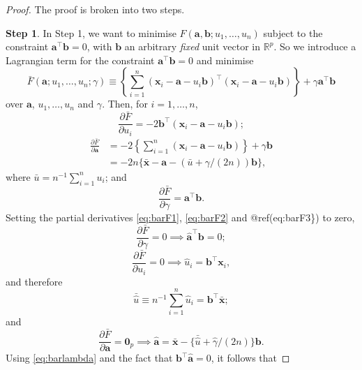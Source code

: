 \documentclass[]{book}
\theoremstyle{definition}
\theoremstyle{definition}
\theoremstyle{definition}
\theoremstyle{remark}
\begin{document}
\begin{proof}
{}The proof is broken into two steps.

\textbf{Step 1}. In Step 1, we want to minimise \(F(\boldsymbol a, \boldsymbol b; u_1,\ldots, u_n)\) subject to the constraint \(\boldsymbol a^\top \boldsymbol b=0\), with \(\boldsymbol b\) an arbitrary \emph{fixed} unit vector in \(\mathbb{R}^p\). So we introduce a Lagrangian term for the constraint \(\boldsymbol a^\top \boldsymbol b=0\) and minimise
\[
\bar{F}(\boldsymbol a; u_1,\ldots ,  u_n; \gamma)
 \equiv \left \{\sum_{i=1}^n (\boldsymbol x_i -\boldsymbol a-u_i\boldsymbol b)^\top
(\boldsymbol x_i-\boldsymbol a-u_i\boldsymbol b)\right \}+ \gamma \boldsymbol a^\top \boldsymbol b
\]
over \(\boldsymbol a\), \(u_1, \ldots , u_n\) and \(\gamma\). Then, for \(i=1, \ldots , n\),
\begin{equation}
\frac{\partial \bar{F}}{\partial u_i}=-2\boldsymbol b^\top (\boldsymbol x_i-\boldsymbol a-u_i\boldsymbol b);
\label{eq:barF1}
\end{equation}
\begin{align}
\frac{\partial \bar{F}}{\partial \boldsymbol a}&=-2\left \{\sum_{i=1}^n (\boldsymbol x_i -\boldsymbol a-u_i\boldsymbol b)\right \}+\gamma \boldsymbol b\nonumber\\
&=-2n\{\bar{\boldsymbol x}-\boldsymbol a-(\bar{u}+\gamma/(2n))\boldsymbol b\},
\label{eq:barF2}
\end{align}
where \(\bar{u}=n^{-1}\sum_{i=1}^n u_i\); and
\begin{equation}
\frac{\partial \bar{F}}{\partial \gamma}=\boldsymbol a^\top \boldsymbol b.
\label{eq:barF3}
\end{equation}
Setting the partial derivatives \eqref{eq:barF1}, \eqref{eq:barF2} and @ref(eq:barF3\}) to zero,
\[
\frac{\partial \bar{F}}{\partial \gamma} =0 \implies \hat{\boldsymbol a}^\top \boldsymbol b=0;
\]
\begin{equation}
\frac{\partial \bar{F}}{\partial u_i}=0 \implies \hat{u}_i=\boldsymbol b^\top \boldsymbol x_i,
\label{eq:uhat}
\end{equation}
and therefore
\begin{equation}
\bar{\hat{u}}\equiv n^{-1} \sum_{i=1}^n \hat{u}_i=\boldsymbol b^\top \bar{\boldsymbol x};
\label{eq:barlambda}
\end{equation}
and
\[
\frac{\partial \bar{F}}{\partial \boldsymbol a}={\mathbf 0}_p \implies \hat{\boldsymbol a}=\bar{\boldsymbol x}-\{\bar{\hat{u}}+\hat{\gamma}/(2n)\}\boldsymbol b.
\]
Using \eqref{eq:barlambda} and the fact that \(\boldsymbol b^\top \hat{\boldsymbol a}=0\), it follows that

\end{proof}
\end{document}
